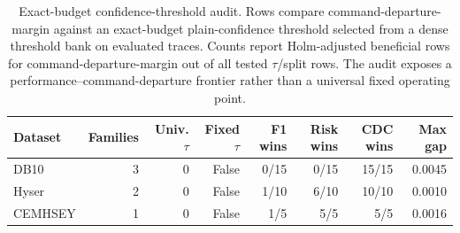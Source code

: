 \begin{table}[!t]
\centering
\caption{Exact-budget confidence-threshold audit. Rows compare command-departure-margin against an exact-budget plain-confidence threshold selected from a dense threshold bank on evaluated traces. Counts report Holm-adjusted beneficial rows for command-departure-margin out of all tested $\tau$/split rows. The audit exposes a performance--command-departure frontier rather than a universal fixed operating point.}
\label{tab:exact-budget}
\footnotesize
\begin{tabular}{lrrrrrrr}
\toprule
Dataset & Families & Univ. $\tau$ & Fixed $\tau$ & F1 wins & Risk wins & CDC wins & Max gap \\
\midrule
DB10 & 3 & 0 & False & 0/15 & 0/15 & 15/15 & 0.0045 \\
Hyser & 2 & 0 & False & 1/10 & 6/10 & 10/10 & 0.0010 \\
CEMHSEY & 1 & 0 & False & 1/5 & 5/5 & 5/5 & 0.0016 \\
\bottomrule
\end{tabular}
\end{table}

